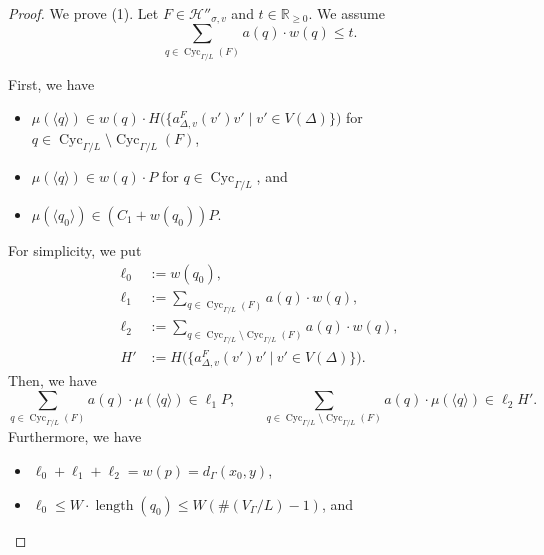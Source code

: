 \begin{proof}
We prove (1). 
Let $F \in \mathcal{H}'' _{\sigma, v}$ and $t \in \mathbb{R}_{\ge 0}$. 
We assume 
\[
\sum _{q \in \operatorname{Cyc}_{\Gamma /L}(F)} a(q) \cdot w(q) \le t. 
\]

First, we have
\begin{itemize}
\item 
$\mu(\langle q \rangle) \in w(q) \cdot
H \bigl( \bigl \{ a^{F} _{\Delta, v} (v') v' \mid v' \in V(\Delta) \bigr \} \bigr)$ 
for $q \in \operatorname{Cyc}_{\Gamma /L} \setminus \operatorname{Cyc}_{\Gamma /L}(F)$, 

\item 
$\mu(\langle q \rangle) \in w(q) \cdot P$ for 
$q \in \operatorname{Cyc}_{\Gamma /L}$, and 

\item 
$\mu(\langle q_0 \rangle) \in (C_1 + w(q_0)) P$. 
\end{itemize}
For simplicity, we put 
\begin{align*}
\ell _0 &:= w(q_0), \\
\ell _1 &:= \sum _{q \in \operatorname{Cyc}_{\Gamma /L}(F)} a(q) \cdot w(q), \\
\ell _2 &:= \sum _{q \in \operatorname{Cyc}_{\Gamma /L} \setminus \operatorname{Cyc}_{\Gamma /L}(F)} 
a(q) \cdot w(q), \\
H' &:= H \bigl( \bigl \{ a^{F} _{\Delta, v} (v') v' \ \big | \ v' \in V(\Delta) \bigr \} \bigr). 
\end{align*}
Then, we have 
\[
\sum _{q \in \operatorname{Cyc}_{\Gamma /L}(F)} a(q) \cdot \mu(\langle q \rangle) 
\in \ell _1 P, \qquad
\sum _{q \in \operatorname{Cyc}_{\Gamma /L} \setminus \operatorname{Cyc}_{\Gamma /L}(F)} a(q) \cdot \mu(\langle q \rangle) 
\in \ell _2 H'. 
\]
Furthermore, we have
\begin{itemize}
\item
$\ell _0 + \ell _1 + \ell _2 = w(p) = d_{\Gamma}(x_0, y)$, 

\item
$\ell _0 \le W \cdot \operatorname{length}(q_0)  \le W(\#(V_{\Gamma}/L) -1)$, and


\end{itemize}
\end{proof}
